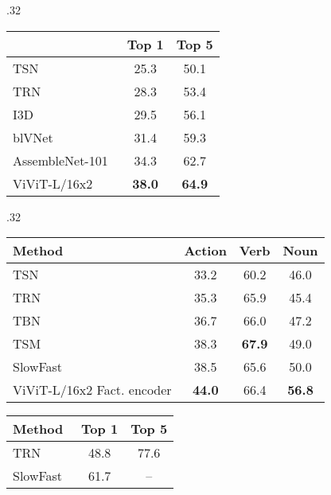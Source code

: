 \documentclass[10pt,twocolumn,letterpaper]{article}
\begin{document}
\begin{table*}[tb]
\begin{subtable}[t]{.32\linewidth}
{\begin{tabular}{lcc}
  				& Top 1 & Top 5 \\ 
  				\midrule
  				TSN~\cite{wang_tsn_eccv_2016}				& 25.3		 &  50.1	\\
  				TRN~\cite{zhou_trn_eccv_2018}				 & 28.3		 &  53.4	 \\
  				I3D~\cite{carreira_cvpr_2017}					& 29.5		&  56.1		\\
  				blVNet~\cite{fan_blvnet_neurips_2019}	 &  31.4	 &  59.3 	 \\
  				AssembleNet-101~\cite{ryoo_iclr_2020} 	&  34.3     &  62.7     \\
  				\midrule
  				ViViT-L/16x2											& \textbf{38.0} & \textbf{64.9} \\ \bottomrule
  			\end{tabular}
  			\label{tab:sota_moments_in_time}
  		}
  	\end{subtable}
  	\hfill
  	\begin{subtable}[t]{.32\linewidth}
  		\caption{Epic Kitchens 100 Top 1 accuracy}
  		\setlength{\tabcolsep}{4pt} \vspace{-0.3\baselineskip}
		\scriptsize{
			\begin{tabular}{lccc}
				\toprule
				Method 													 & Action & Verb  & Noun  \\
				\midrule
				TSN~\cite{wang_tsn_eccv_2016}		 		&  33.2 & 60.2 & 46.0  \\
				TRN~\cite{zhou_trn_eccv_2018} 				& 35.3 & 65.9 & 45.4   \\
				TBN~\cite{kazakos_iccv_2019}				 & 36.7 & 66.0 & 47.2    \\
				TSM~\cite{lin_tsm_cvpr_2019} 				 & 38.3 & \textbf{67.9} & 49.0  \\
				SlowFast~\cite{feichtenhofer_iccv_2019}  & 38.5 & 65.6 & 50.0  \\
				\midrule
				ViViT-L/16x2 Fact. encoder & \textbf{44.0} & 66.4 & \textbf{56.8} \\ \bottomrule
			\end{tabular}
		}
		\label{tab:sota_epic_kitchens}
		\vspace{0.4\baselineskip}
		\centering
		\caption{Something-Something v2}
		\setlength{\tabcolsep}{6pt} \scriptsize{
			\begin{tabular}{lcc}
				\toprule
				Method 												  & Top 1                & Top 5   \\
				\midrule
				TRN~\cite{zhou_trn_eccv_2018}										& 48.8 & 77.6 \\
				SlowFast~\cite{feichtenhofer_cvpr_2020,wu_multigrid_cvpr_2020}		& 61.7 & --    \\

\end{tabular}}
\end{subtable}
\end{table*}
\end{document}
